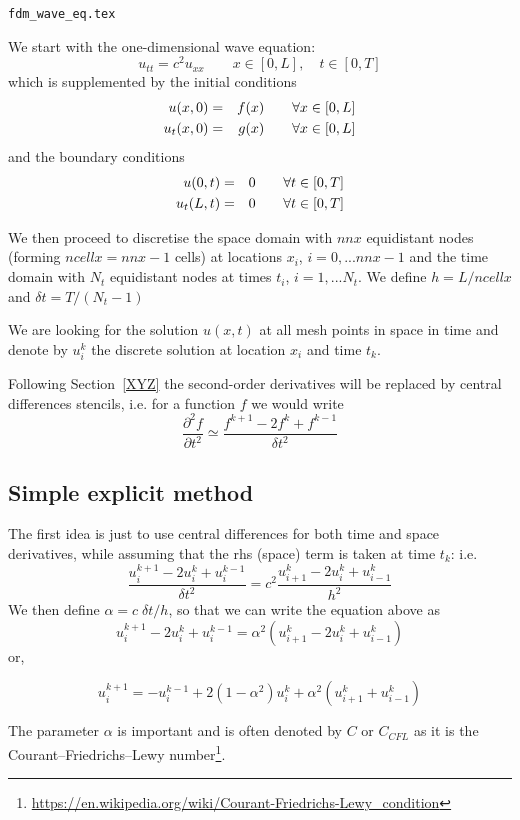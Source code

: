 
\begin{flushright} {\tiny {\color{gray} \tt fdm\_wave\_eq.tex}} \end{flushright}

We start with the one-dimensional wave equation:
\[
u_{tt}=c^2 u_{xx}  \qquad x\in[0,L], \quad t\in[0,T]
\]
which is supplemented by the initial conditions
\begin{eqnarray}
u(x,0) &=& f(x) \qquad  \forall x\in[0,L] \nonumber\\
u_t(x,0) &=& g(x) \qquad  \forall x\in[0,L] 
\end{eqnarray}
and the boundary conditions
\begin{eqnarray}
u(0,t) &=& 0 \qquad  \forall t \in [0,T] \nonumber\\
u_t(L,t) &=& 0 \qquad  \forall t\in[0,T] \label{eq:fdm_wave_bc}
\end{eqnarray}


We then proceed to discretise the space domain with $nnx$ equidistant nodes (forming $ncellx=nnx-1$ cells)
at locations $x_i$, $i=0,...nnx-1$ and the time domain with $N_t$ equidistant nodes at times
$t_i$, $i=1,...N_t$.
We define $h=L/ncellx$ and $\delta\! t=T/(N_t-1)$

We are looking for the solution $u(x,t)$ at all mesh points in space in time and denote by 
$u_i^k$ the discrete solution at location $x_i$ and time $t_k$.

Following Section~\ref{XYZ} the second-order derivatives will be replaced by central differences 
stencils, i.e. for a function $f$ we would write
\[
\frac{\partial^2  f}{\partial t^2} \simeq \frac{ f^{k+1} -2f^{k} +f^{k-1}  }{\delta\! t^2}
\]

\subsection{Simple explicit method}
\label{ss:fdmwavess}

The first idea is just to use central differences for both time and space derivatives,
while assuming that the rhs (space) term is taken at time $t_k$:
i.e.
\[
\frac{ u_i^{k+1} -2u_i^{k} +u_i^{k-1}  }{\delta\! t^2} = 
c^2
\frac{ u_{i+1}^k -2u_{i}^k +u_{i-1}^k  }{h^2} 
\]
We then define $\alpha = c\; \delta\! t / h$, so that we can write the equation above as
\begin{equation}
u_i^{k+1} -2u_i^{k} +u_i^{k-1}  = \alpha^2 (u_{i+1}^k -2u_{i}^k +u_{i-1}^k )
\label{eq:fdmwave1}
\end{equation}
or,
\begin{mdframed}[backgroundcolor=blue!5]
\begin{equation}
u_i^{k+1} = - u_i^{k-1} +2(1-\alpha^2) u_{i}^k + \alpha^2 (u_{i+1}^k +u_{i-1}^k ) 
\label{eq:wavee3}
\end{equation}
\end{mdframed}
The parameter $\alpha$ is important and is often denoted by $C$ or $C_{CFL}$ as it is the 
Courant–Friedrichs–Lewy number\footnote{\url{https://en.wikipedia.org/wiki/Courant-Friedrichs-Lewy_condition}}.

